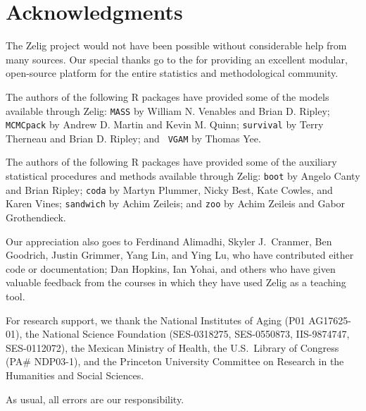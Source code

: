 \section*{Acknowledgments}  

The Zelig project would not have been possible without considerable
help from many sources.  Our special thanks go to the  for providing an
excellent modular, open-source platform for the entire statistics and
methodological community.

The authors of the following R packages have provided some of the
models available through Zelig: {\tt MASS} by William N. Venables and
Brian D. Ripley; {\tt MCMCpack} by Andrew D. Martin and Kevin M.
Quinn; {\tt survival} by Terry Therneau and Brian D. Ripley; and {\tt
  VGAM} by Thomas Yee.  

The authors of the following R packages have provided some of the
auxiliary statistical procedures and methods available through Zelig:
{\tt boot} by Angelo Canty and Brian Ripley; {\tt coda} by Martyn
Plummer, Nicky Best, Kate Cowles, and Karen Vines; {\tt sandwich} by
Achim Zeileis; and {\tt zoo} by Achim Zeileis and Gabor Grothendieck.

Our appreciation also goes to Ferdinand Alimadhi, Skyler J.\ Cranmer,
Ben Goodrich, Justin Grimmer, Yang Lin, and Ying Lu, who have
contributed either code or documentation; Dan Hopkins, Ian Yohai, and
others who have given valuable feedback from the courses in which they
have used Zelig as a teaching tool.

For research support, we thank the National Institutes of Aging (P01
AG17625-01), the National Science Foundation (SES-0318275,
SES-0550873, IIS-9874747, SES-0112072), the Mexican Ministry of
Health, the U.S.\ Library of Congress (PA\# NDP03-1), and the
Princeton University Committee on Research in the Humanities and
Social Sciences.

As usual, all errors are our responsibility.

